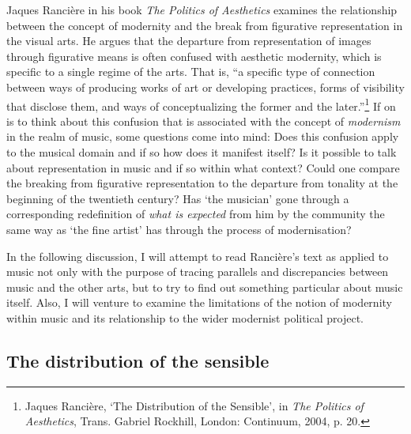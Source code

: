 Jaques Ranci\`{e}re in his book \emph{The Politics of Aesthetics} examines the relationship between the concept of modernity and the break from figurative representation in the visual arts. He argues that the departure from representation of images through figurative means is often confused with aesthetic modernity, which is specific to a single regime of the arts. That is, ``a specific type of connection between ways of producing works of art or developing practices, forms of visibility that disclose them, and ways of conceptualizing the former and the later.''\footnote{Jaques Ranci\`{e}re, `The Distribution of the Sensible', in \emph{The Politics of Aesthetics}, Trans. Gabriel Rockhill, London: Continuum, 2004, p. 20.} If on is to think about this confusion that is associated with the concept of \emph{modernism} in the realm of music, some questions come into mind: Does this confusion apply to the musical domain and if so how does it manifest itself? Is it possible to talk about representation in music and if so within what context? Could one compare the breaking from figurative representation to the departure from tonality at the beginning of the twentieth century? Has `the musician' gone through a corresponding redefinition of \emph{what is expected} from him by the community the same way as `the fine artist' has through the process of modernisation?

In the following discussion, I will attempt to read Ranci\`{e}re's text as applied to music not only with the purpose of tracing parallels and discrepancies between music and the other arts, but to try to find out something particular about music itself. Also, I will venture to examine the limitations of the notion of modernity within music and its relationship to the wider modernist political project.

\subsection{The distribution of the sensible}

